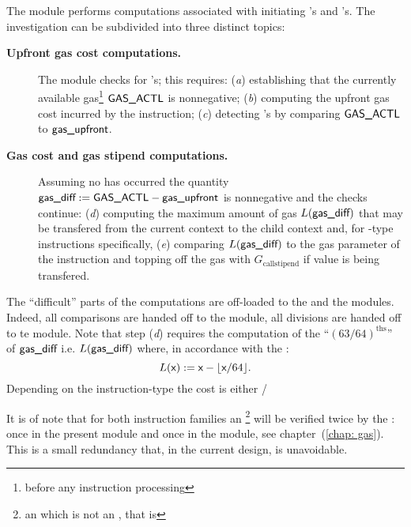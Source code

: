 The \stpMod{} module performs computations associated with initiating 's and 's. The investigation can be subdivided into three distinct topics:
\begin{description}
	\item[\colorbox{solarized-orange}{\textbf{Upfront gas cost computations.}}]
		The module checks for \oogxSH{}'s; this requires:
		(\emph{a}) establishing that the currently available gas\footnote{before any instruction processing} $\textsf{GAS}\textsf{\_ACTL}$ is nonnegative;
		(\emph{b}) computing the upfront gas cost \locGasUpfront{} incurred by the instruction;
		(\emph{c}) detecting \oogxSH{}'s by comparing $\textsf{GAS}\textsf{\_ACTL}$ to $\textsf{gas\_upfront}$.
	\item[\colorbox{solarized-green}{\textbf{Gas cost and gas stipend computations.}}]
		Assuming no \oogxSH{} has occurred the quantity $\textsf{gas\_diff} := \textsf{GAS}\textsf{\_ACTL} - \textsf{gas\_upfront}$ is nonnegative and the checks continue:
		(\emph{d})
		computing the maximum amount of gas $L(\textsf{gas\_diff})$ that may be transfered from the current context to the child context and,
		for -type instructions specifically,
		(\emph{e})  comparing $L(\textsf{gas\_diff})$ to the gas parameter of the instruction and topping off the gas with $G_\text{callstipend}$ if value is being transfered.
\end{description}
The ``difficult'' parts of the computations are off-loaded to the \wcpMod{} and the \modMod{} modules. Indeed, all comparisons are handed off to the \wcpMod{} module, all divisions are handed off to te \modMod{} module. Note that step (\emph{d}) requires the computation of the ``$(63/64)^{\text{ths}}$'' of $\textsf{gas\_diff}{}$ i.e. $L(\textsf{gas\_diff})$ where, in accordance with the \cite{EYP}:
\[ L(\textsf{x}) := \textsf{x} - \lfloor \textsf{x}/64 \rfloor . \]
\saNote{} Depending on the instruction-type the \locGasUpfront{} cost is either \locGasUpfrontCall{} / \locGasUpfrontCreate{}

\saNote{} It is of note that for both instruction families an \oogxSH{}\footnote{an \oogxSH{} which is not an \mxpxSH{}, that is} will be verified twice by the \zkEvm{}:
once in the present \stpMod{} module and
once in the \gasMod{} module, see chapter~(\ref{chap: gas}).
This is a small redundancy that, in the current design, is unavoidable.
